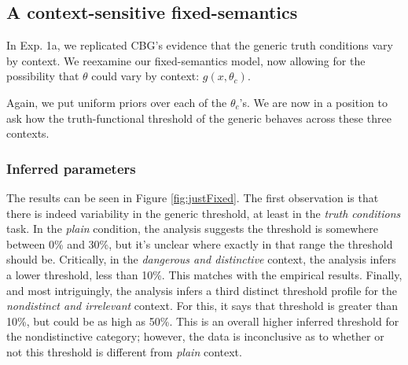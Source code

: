 \documentclass[10pt,letterpaper]{article}
\begin{document}


\subsection{A context-sensitive fixed-semantics}

In Exp. 1a, we replicated CBG's evidence that the generic truth conditions vary by context. We reexamine our fixed-semantics model, now allowing for the possibility that $\theta$ could vary by context: $g(x,\theta_{c})$.



Again, we put uniform priors over each of the $\theta_{c}$'s. We are now in a position to ask how the truth-functional threshold of the generic behaves across these three contexts. 

\subsubsection{Inferred parameters}

The results can be seen in Figure \ref{fig:justFixed}. The first observation is that there is indeed variability in the generic threshold, at least in the \emph{truth conditions} task. In the \emph{plain} condition, the analysis suggests the threshold is somewhere between 0\% and 30\%, but it's unclear where exactly in that range the threshold should be. Critically, in the \emph{dangerous and distinctive} context, the analysis infers a lower threshold, less than 10\%. This matches with the empirical results. Finally, and most intriguingly, the analysis infers a third distinct threshold profile for the \emph{nondistinct and irrelevant} context.  For this, it says that threshold is greater than 10\%, but could be as high as 50\%. This is an overall higher inferred threshold for the nondistinctive category; however, the data is inconclusive as to whether or not this threshold is different from \emph{plain} context.
\end{document}
